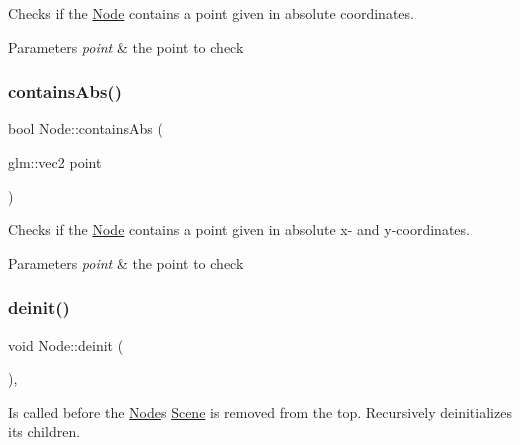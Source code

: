 Checks if the \mbox{\hyperlink{classsage_1_1Node}{Node}} contains a point given in absolute coordinates. 


\begin{DoxyParams}{Parameters}
{\em point} & the point to check \\
\hline
\end{DoxyParams}
\mbox{\label{classsage_1_1Node_a5ab70d0b3fc9a167175f7f864549db4d}} 
\subsubsection{\texorpdfstring{containsAbs()}{containsAbs()}\hspace{0.1cm}{\footnotesize\ttfamily [2/2]}}
{\footnotesize\ttfamily bool Node\+::contains\+Abs (\begin{DoxyParamCaption}\item[{glm\+::vec2}]{point }\end{DoxyParamCaption})}



Checks if the \mbox{\hyperlink{classsage_1_1Node}{Node}} contains a point given in absolute x-\/ and y-\/coordinates. 


\begin{DoxyParams}{Parameters}
{\em point} & the point to check \\
\hline
\end{DoxyParams}
\mbox{\label{classsage_1_1Node_a726445f512453846694fd36ffa615b22}} 
\subsubsection{\texorpdfstring{deinit()}{deinit()}}
{\footnotesize\ttfamily void Node\+::deinit (\begin{DoxyParamCaption}{ }\end{DoxyParamCaption})\hspace{0.3cm}{\ttfamily [protected]}, {\ttfamily [virtual]}}



Is called before the \mbox{\hyperlink{classsage_1_1Node}{Node}}\textquotesingle{}s \mbox{\hyperlink{classsage_1_1Scene}{Scene}} is removed from the top. Recursively deinitializes its children. 

